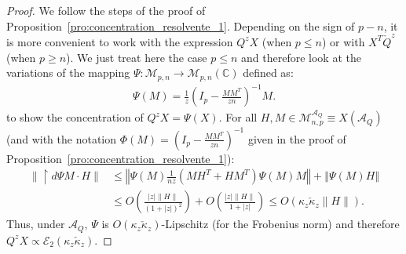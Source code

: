 \documentclass[a4papaer, titlepage]{book}
\begin{document}
\begin{proof}
  We follow the steps of the proof of Proposition~\ref{pro:concentration_resolvente_1}. Depending on the sign of $p-n$, it is more convenient to work with the expression $Q^z X$ (when $p\leq n$) or with $ X^T \check Q^z$ (when $p\geq n$). 
  We just treat here the case $p\leq n$ and therefore look at the variations of the mapping $\Psi : \mathcal M_{p,n} \to \mathcal M_{p, n}(\mathbb C)$ defined as:
  \begin{align*}
     \Psi(M) =  \frac{1}{z }\left(I_p - \frac{MM^T}{zn}\right)^{-1} M.
   \end{align*}
   to show the concentration of $Q^z X  = \Psi(X)$. %
   For all $H, M \in \mathcal M_{n,p}^{\mathcal A_Q} \equiv X(\mathcal A_Q)$ (and with the notation $\Phi(M) = \left(I_p - \frac{MM^T}{zn}\right)^{-1} $ given in the proof of Proposition~\ref{pro:concentration_resolvente_1}):
  \begin{align*}
    \|\restriction{d\Psi }{M} \cdot H\| 
    & \leq \left\Vert \Psi \left(M\right)\frac{1}{nz}(MH^T + HM^T) \Psi \left(M\right) M\right\Vert + \left\Vert \Psi \left(M\right)H\right\Vert\\
    &\leq O \left(\frac{|z|\|H\|}{(1+|z|)^ 2}\right) + O \left(\frac{|z|\|H\|}{1+|z|}\right) \leq O \left(\kappa_z\check\kappa_z\|H\|\right).
  \end{align*}
  Thus, under $\mathcal A_Q$, $\Psi$ is $O(\kappa_z\check\kappa_z)$-Lipschitz (for the Frobenius norm) and therefore $Q^zX \propto \mathcal E_2(\kappa_z\check\kappa_z)$. 


\end{proof}
\end{document}
